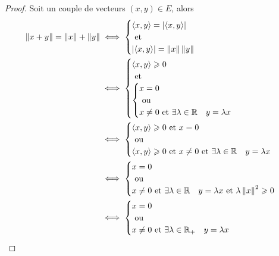 \begin{proof}
  Soit un couple de  vecteurs \((x,y) \in E\), alors
  \begin{align}
    \left\lVert x+y\right\rVert = \left\lVert x\right\rVert+\left\lVert y\right\rVert &\iff
    \begin{cases}
      \left\langle{x},{y}\right\rangle = \left\lvert\left\langle{x},{y}\right\rangle\right\rvert \\ 
      \text{~et~} \\
      \left\lvert\left\langle{x},{y}\right\rangle\right\rvert = \left\lVert x\right\rVert\left\lVert y\right\rVert
    \end{cases} \\
    &\iff
    \begin{cases}
      \left\langle{x},{y}\right\rangle \geqslant 0 \\ 
      \text{~et~} \\ 
      \begin{cases}
        x=0 \\ 
        \text{~ou~} \\ 
        x\neq 0 \text{~et~} \exists \lambda \in \mathbb{R} \quad y=\lambda x
      \end{cases}
    \end{cases}\\
    & \iff
    \begin{cases}
      \left\langle{x},{y}\right\rangle \geqslant 0 \text{~et~} x = 0 \\
      \text{~ou~} \\
      \left\langle{x},{y}\right\rangle \geqslant 0 \text{~et~} x \neq 0 \text{~et~} \exists \lambda \in \mathbb{R} \quad y=\lambda x
    \end{cases}\\
    & \iff
    \begin{cases} 
      x=0 \\ 
      \text{~ou~} \\ 
      x \neq 0 \text{~et~} \exists \lambda \in \mathbb{R} \quad y=\lambda x \text{~et~} \lambda\left\lVert x\right\rVert^2 \geqslant 0
    \end{cases} \\
    & \iff 
    \begin{cases} 
      x=0 \\ 
      \text{~ou~} \\ 
      x \neq 0 \text{~et~} \exists \lambda \in \mathbb{R}_{+} \quad y=\lambda x 
    \end{cases}
  \end{align}
\end{proof}

